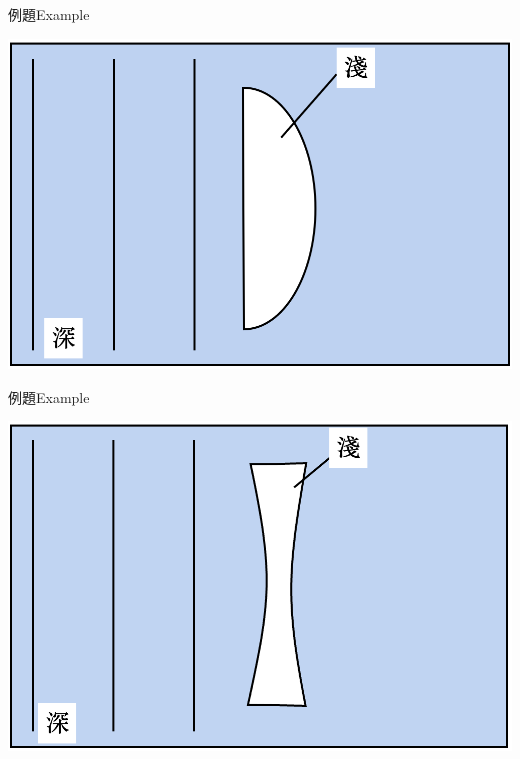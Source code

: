 \documentclass[beamer=true]{standalone}
\begin{document}
\begin{frame}[t]{例題Example}
    \par{\par\centering\includegraphics[width=\textwidth]{./img/ch2_cf_2024-05-24-15-17-10.png}\par}
\end{frame}

\begin{frame}[t]{例題Example}
    \par{\par\centering\includegraphics[width=\textwidth]{./img/ch2_cf_2024-05-24-15-17-38.png}\par}
\end{frame}
\end{document}

